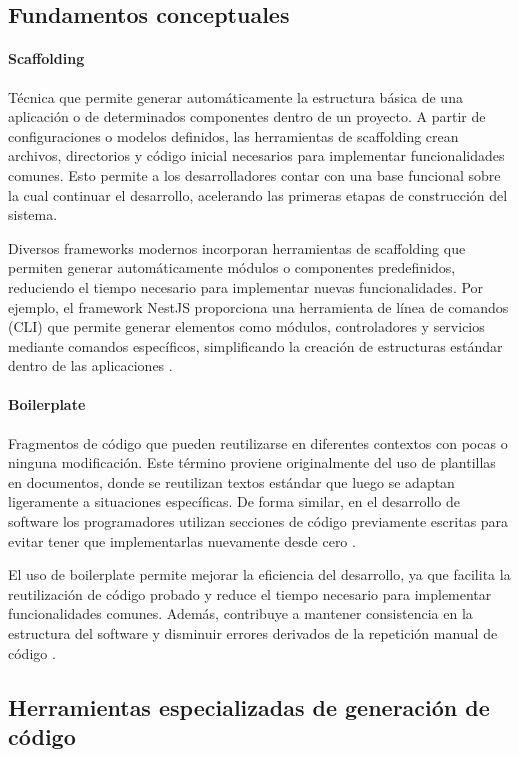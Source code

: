 \subsection{Fundamentos conceptuales}
\paragraph*{Scaffolding}
Técnica que permite generar automáticamente la estructura básica de una aplicación o de determinados componentes dentro de un proyecto. A partir de configuraciones o modelos definidos, las herramientas de scaffolding crean archivos, directorios y código inicial necesarios para implementar funcionalidades comunes. Esto permite a los desarrolladores contar con una base funcional sobre la cual continuar el desarrollo, acelerando las primeras etapas de construcción del sistema.

Diversos frameworks modernos incorporan herramientas de scaffolding que permiten generar automáticamente módulos o componentes predefinidos, reduciendo el tiempo necesario para implementar nuevas funcionalidades. Por ejemplo, el framework NestJS proporciona una herramienta de línea de comandos (CLI) que permite generar elementos como módulos, controladores y servicios mediante comandos específicos, simplificando la creación de estructuras estándar dentro de las aplicaciones \citep{nestjs-2026}.
\paragraph*{Boilerplate}
Fragmentos de código que pueden reutilizarse en diferentes contextos con pocas o ninguna modificación. Este término proviene originalmente del uso de plantillas en documentos, donde se reutilizan textos estándar que luego se adaptan ligeramente a situaciones específicas. De forma similar, en el desarrollo de software los programadores utilizan secciones de código previamente escritas para evitar tener que implementarlas nuevamente desde cero \citep{aws-boilerplate-2026}.

El uso de boilerplate permite mejorar la eficiencia del desarrollo, ya que facilita la reutilización de código probado y reduce el tiempo necesario para implementar funcionalidades comunes. Además, contribuye a mantener consistencia en la estructura del software y disminuir errores derivados de la repetición manual de código \citep{aws-boilerplate-2026}.

\subsection{Herramientas especializadas de generación de código}
